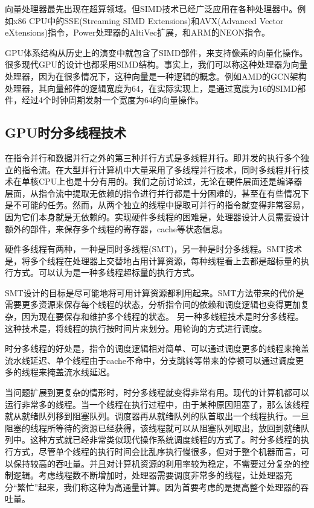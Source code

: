 向量处理器最先出现在超算领域。但SIMD技术已经广泛应用在各种处理器中。例如x86 CPU中的SSE(Streaming SIMD Extensions)和AVX(Advanced Vector eXtensions)指令，Power处理器的AltiVec扩展，和ARM的NEON指令。

GPU体系结构从历史上的演变中就包含了SIMD部件，来支持像素的向量化操作。很多现代GPU的设计也都采用SIMD结构。事实上，我们可以称这种处理器为向量处理器，因为在很多情况下，这种向量是一种逻辑的概念。例如AMD的GCN架构处理器，其向量部件的逻辑宽度为64，在实际实现上，是通过宽度为16的SIMD部件，经过4个时钟周期发射一个宽度为64的向量操作。

\subsection{GPU时分多线程技术}
在指令并行和数据并行之外的第三种并行方式是多线程并行。即并发的执行多个独立的指令流。在大型并行计算机中大量采用了多线程并行技术，同时多线程并行技术在单核CPU上也是十分有用的。我们之前讨论过，无论在硬件层面还是编译器层面，从指令流中提取无依赖的指令进行并行都是十分困难的，甚至在有些情况下是不可能的任务。然而，从两个独立的线程中提取可并行的指令就变得非常容易，因为它们本身就是无依赖的。实现硬件多线程的困难是，处理器设计人员需要设计额外的部件，来保存多个线程的寄存器，cache等状态信息。

硬件多线程有两种，一种是同时多线程(SMT)，另一种是时分多线程。SMT技术是，将多个线程在处理器上交替地占用计算资源，每种线程看上去都是超标量的执行方式。可以认为是一种多线程超标量的执行方式。

SMT设计的目标是尽可能地将可用计算资源都利用起来。SMT方法带来的代价是需要更多资源来保存每个线程的状态，分析指令间的依赖和调度逻辑也变得更加复杂，因为现在要保存和维护多个线程的状态。
另一种多线程技术是时分多线程。这种技术是，将线程的执行按时间片来划分。用轮询的方式进行调度。

时分多线程的好处是，指令的调度逻辑相对简单、可以通过调度更多的线程来掩盖流水线延迟、单个线程由于cache不命中，分支跳转等带来的停顿可以通过调度更多的线程来掩盖流水线延迟。

当问题扩展到更复杂的情形时，时分多线程就变得非常有用。现代的计算机都可以运行非常多的线程。当一个线程在执行过程中，由于某种原因阻塞了，那么该线程就从就绪队列移到阻塞队列。调度器再从就绪队列的队首取出一个线程执行。一旦阻塞的线程所等待的资源已经获得，该线程就可以从阻塞队列取出，放回到就绪队列中。这种方式就已经非常类似现代操作系统调度线程的方式了。时分多线程的执行方式，尽管单个线程的执行时间会比乱序执行慢很多，但对于整个机器而言，可以保持较高的吞吐量。并且对计算机资源的利用率较为稳定，不需要过分复杂的控制逻辑。考虑线程数不断增加时，处理器需要调度非常多的线程，让处理器充分“繁忙”起来，我们称这种为高通量计算。因为首要考虑的是提高整个处理器的吞吐量。

